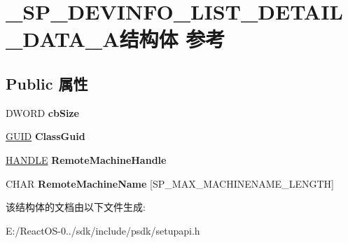\hypertarget{struct___s_p___d_e_v_i_n_f_o___l_i_s_t___d_e_t_a_i_l___d_a_t_a___a}{}\section{\+\_\+\+S\+P\+\_\+\+D\+E\+V\+I\+N\+F\+O\+\_\+\+L\+I\+S\+T\+\_\+\+D\+E\+T\+A\+I\+L\+\_\+\+D\+A\+T\+A\+\_\+\+A结构体 参考}
\label{struct___s_p___d_e_v_i_n_f_o___l_i_s_t___d_e_t_a_i_l___d_a_t_a___a}
\subsection*{Public 属性}
\begin{DoxyCompactItemize}
\item 
\mbox{\label{struct___s_p___d_e_v_i_n_f_o___l_i_s_t___d_e_t_a_i_l___d_a_t_a___a_a7c64c33d722eb1a5e06a85b748b6b978}} 
D\+W\+O\+RD {\bfseries cb\+Size}
\item 
\mbox{\label{struct___s_p___d_e_v_i_n_f_o___l_i_s_t___d_e_t_a_i_l___d_a_t_a___a_aa4f3d85804bcdd3863055c11f84bdf31}} 
\hyperlink{interface_g_u_i_d}{G\+U\+ID} {\bfseries Class\+Guid}
\item 
\mbox{\label{struct___s_p___d_e_v_i_n_f_o___l_i_s_t___d_e_t_a_i_l___d_a_t_a___a_a33960c4923ff77d67efd8191b3ab81c2}} 
\hyperlink{interfacevoid}{H\+A\+N\+D\+LE} {\bfseries Remote\+Machine\+Handle}
\item 
\mbox{\label{struct___s_p___d_e_v_i_n_f_o___l_i_s_t___d_e_t_a_i_l___d_a_t_a___a_a4f9eccca3f60508390e8ae8ab9168ada}} 
C\+H\+AR {\bfseries Remote\+Machine\+Name} \mbox{[}S\+P\+\_\+\+M\+A\+X\+\_\+\+M\+A\+C\+H\+I\+N\+E\+N\+A\+M\+E\+\_\+\+L\+E\+N\+G\+TH\mbox{]}
\end{DoxyCompactItemize}


该结构体的文档由以下文件生成\+:\begin{DoxyCompactItemize}
\item 
E\+:/\+React\+O\+S-\/0../sdk/include/psdk/setupapi.\+h\end{DoxyCompactItemize}
